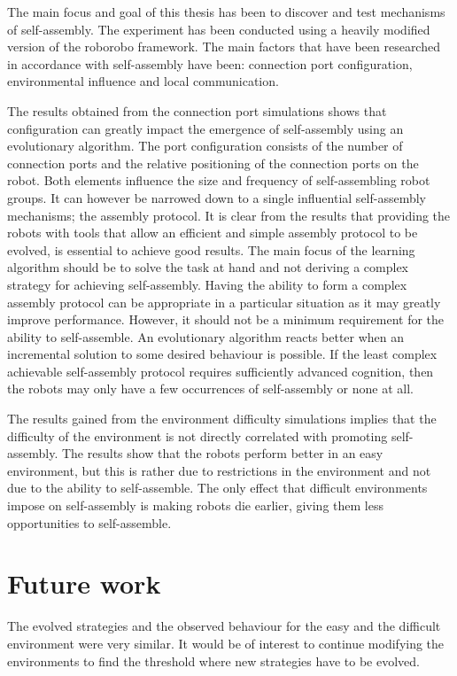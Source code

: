 The main focus and goal of this thesis has been to discover and test mechanisms of self-assembly.
The experiment has been conducted using a heavily modified version of the roborobo framework.
The main factors that have been researched in accordance with self-assembly have been: connection port configuration, environmental influence and local communication.

The results obtained from the connection port simulations shows that configuration can greatly impact the emergence of self-assembly using an evolutionary algorithm.
The port configuration consists of the number of connection ports and the relative positioning of the connection ports on the robot.
Both elements influence the size and frequency of self-assembling robot groups.
It can however be narrowed down to a single influential self-assembly mechanisms; the assembly protocol.
It is clear from the results that providing the robots with tools that allow an efficient and simple assembly protocol to be evolved, is essential to achieve good results.
The main focus of the learning algorithm should be to solve the task at hand and not deriving a complex strategy for achieving self-assembly.
Having the ability to form a complex assembly protocol can be appropriate in a particular situation as it may greatly improve performance.
However, it should not be a minimum requirement for the ability to self-assemble.
An evolutionary algorithm reacts better when an incremental solution to some desired behaviour is possible.
If the least complex achievable self-assembly protocol requires sufficiently advanced cognition, then the robots may only have a few occurrences of self-assembly or none at all.

The results gained from the environment difficulty simulations implies that the difficulty of the environment is not directly correlated with promoting self-assembly.
The results show that the robots perform better in an easy environment, but this is rather due to restrictions in the environment and not due to the ability to self-assemble.
The only effect that difficult environments impose on self-assembly is making robots die earlier, giving them less opportunities to self-assemble.


\section{Future work}
The evolved strategies and the observed behaviour for the easy and the difficult environment were very similar.
It would be of interest to continue modifying the environments to find the threshold where new strategies have to be evolved. 
